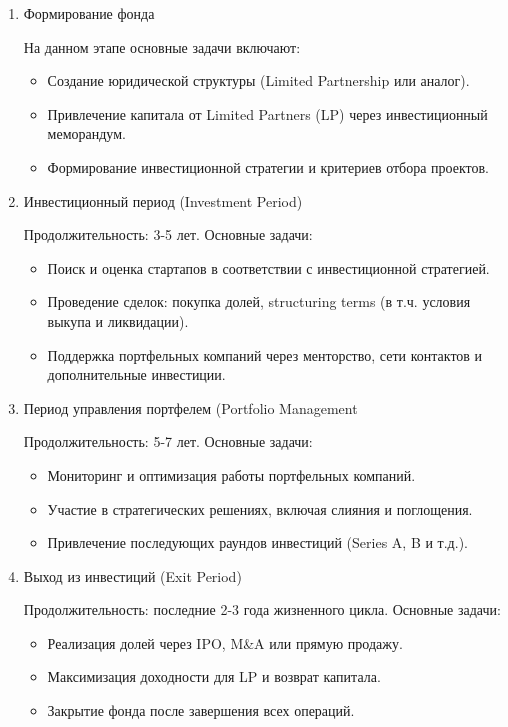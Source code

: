 \begin{enumerate}
    \item Формирование фонда

        На данном этапе основные задачи включают:
        \begin{itemize}
            \item Создание юридической структуры (Limited Partnership или аналог).
            \item Привлечение капитала от Limited Partners (LP) через инвестиционный меморандум.
            \item Формирование инвестиционной стратегии и критериев отбора проектов.
        \end{itemize}

    \item Инвестиционный период (Investment Period)
    
        Продолжительность: 3-5 лет. Основные задачи:
        \begin{itemize}
            \item Поиск и оценка стартапов в соответствии с инвестиционной стратегией.
            \item Проведение сделок: покупка долей, structuring terms (в т.ч. условия выкупа и ликвидации).
            \item Поддержка портфельных компаний через менторство, сети контактов и дополнительные инвестиции.
        \end{itemize}

    \item Период управления портфелем (Portfolio Management

        Продолжительность: 5-7 лет. Основные задачи:
        \begin{itemize}
            \item Мониторинг и оптимизация работы портфельных компаний.
            \item Участие в стратегических решениях, включая слияния и поглощения.
            \item Привлечение последующих раундов инвестиций (Series A, B и т.д.).
        \end{itemize}


    \item Выход из инвестиций (Exit Period)

        Продолжительность: последние 2-3 года жизненного цикла. Основные задачи:
        \begin{itemize}
            \item Реализация долей через IPO, M\&A или прямую продажу.
            \item Максимизация доходности для LP и возврат капитала.
            \item Закрытие фонда после завершения всех операций.
        \end{itemize}
\end{enumerate}


